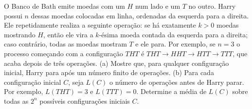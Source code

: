 O Banco de Bath emite moedas com um $H$ num lado e um $T$ no outro.
Harry possui $n$ dessas moedas colocadas em linha, ordenadas da esquerda para a direita.
Ele repetidamente realiza a seguinte operação: se há exatamente $k > 0$ moedas mostrando $H$, então ele vira a $k$-ésima moeda contada da esquerda para a direita; caso contrário, todas as moedas mostram $T$ e ele para.
Por exemplo, se $n = 3$ o processo começando com a configuração $THT$ é $THT \to HHT \to HTT \to TTT$, que acaba depois de três operações.
(a) Mostre que, para qualquer configuração inicial, Harry para após um número finito de operações.
(b) Para cada configuração inicial $C$, seja $L(C)$ o número de operações antes de Harry parar. Por
exemplo, $L(THT) = 3$ e $L(TTT) = 0$. Determine a média de $L(C)$ sobre todas as $2^n$ possíveis
configurações iniciais $C$.